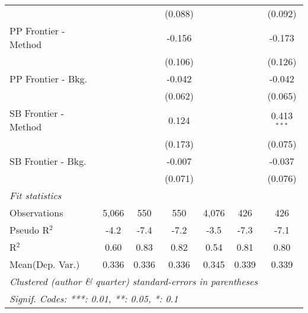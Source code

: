 \begin{tabular}{lcccccc}
                        &         &              & (0.088)        &         &             & (0.092)\\   
   PP Frontier - Method &         &              & -0.156         &         &             & -0.173\\   
                        &         &              & (0.106)        &         &             & (0.126)\\   
   PP Frontier - Bkg.   &         &              & -0.042         &         &             & -0.042\\   
                        &         &              & (0.062)        &         &             & (0.065)\\   
   SB Frontier - Method &         &              & 0.124          &         &             & 0.413$^{***}$\\   
                        &         &              & (0.173)        &         &             & (0.075)\\   
   SB Frontier - Bkg.   &         &              & -0.007         &         &             & -0.037\\   
                        &         &              & (0.071)        &         &             & (0.076)\\   
   \midrule
   \emph{Fit statistics}\\
   Observations         & 5,066   & 550          & 550            & 4,076   & 426         & 426\\  
   Pseudo R$^2$         & -4.2    & -7.4         & -7.2           & -3.5    & -7.3        & -7.1\\  
   R$^2$                & 0.60    & 0.83         & 0.82           & 0.54    & 0.81        & 0.80\\  
Mean(Dep. Var.) & 0.336 & 0.336 & 0.336 & 0.345 & 0.339 & 0.339 \\
   \midrule \midrule
   \multicolumn{7}{l}{\emph{Clustered (author \& quarter) standard-errors in parentheses}}\\
   \multicolumn{7}{l}{\emph{Signif. Codes: ***: 0.01, **: 0.05, *: 0.1}}\\
\end{tabular}
\par\endgroup
